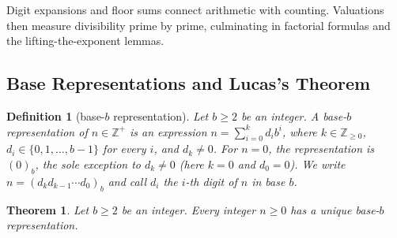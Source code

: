 \documentclass[11pt]{article}
\theoremstyle{ntstyle}
\newtheorem{theorem}{Theorem}[subsection]
\newtheorem{definition}{Definition}[subsection]
\begin{document}
Digit expansions and floor sums connect arithmetic with counting. Valuations then measure divisibility prime by
prime, culminating in factorial formulas and the lifting-the-exponent lemmas.

\subsection{Base Representations and Lucas's Theorem}

\begin{definition}[base-$b$ representation]\label{def:4.1.1} Let $b\ge2$ be an integer.
	A base-$b$ representation of $n\in\mathbb{Z}^+$ is an expression
	$n=\sum_{i=0}^{k}d_i b^i$, where $k\in\mathbb{Z}_{\ge0}$,
	$d_i\in\{0,1,\ldots,b-1\}$ for every $i$, and $d_k\neq0$.
	For $n=0$, the representation is $(0)_b$, the sole exception to $d_k\neq0$ (here $k=0$ and $d_0=0$). We write
	$n=(d_kd_{k-1}\cdots d_0)_b$ and call $d_i$ the $i$-th digit of $n$ in base $b$.
\end{definition}
\begin{theorem}\label{thm:4.1.1} Let $b\ge2$ be an integer. Every integer $n \ge 0$ has a
	unique base-$b$ representation.
\end{theorem}
\end{document}
